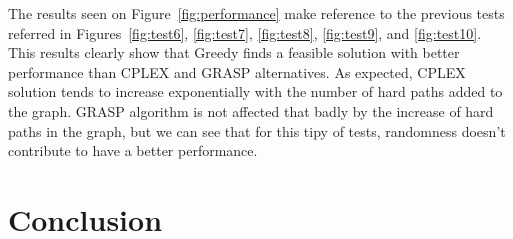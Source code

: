 \documentclass[11pt,a4paper]{article}
\begin{document}
The results seen on Figure~\ref{fig:performance} make reference to the previous tests referred in Figures~\ref{fig:test6}, \ref{fig:test7}, \ref{fig:test8}, \ref{fig:test9}, and \ref{fig:test10}. This results clearly show that Greedy finds a feasible solution with better performance than CPLEX and GRASP alternatives. As expected, CPLEX solution tends to increase exponentially with the number of hard paths added to the graph. GRASP algorithm is not affected that badly by the increase of hard paths in the graph, but we can see that for this tipy of tests, randomness doesn't contribute to have a better performance.

\section{Conclusion}
\end{document}
